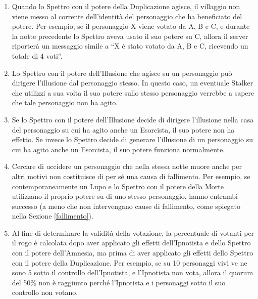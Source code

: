 \documentclass[a4paper,10pt]{article}
\begin{document}
\begin{enumerate}
 \item Quando lo Spettro con il potere della Duplicazione agisce, il villaggio
non viene messo al corrente dell'identità del personaggio che ha beneficiato del
potere. Per esempio, se il personaggio X viene votato da A, B e C, e durante la
notte precedente lo Spettro aveva usato il suo potere su C, allora il server
riporterà un messaggio simile a ``X è stato votato da A, B e C, ricevendo un
totale di 4 voti''.
 
 \item Lo Spettro con il potere dell'Illusione che agisce su un personaggio può
dirigere l'illusione dal personaggio stesso. In questo caso, un eventuale Stalker
che utilizzi a sua volta il suo potere sullo stesso personaggio verrebbe a
sapere che tale personaggio non ha agito.
 
 \item  Se lo Spettro con il potere dell'Illusione decide di dirigere l'illusione 
nella casa del personaggio su cui ha agito anche un Esorcista, il suo potere
non ha effetto.
 Se invece lo Spettro decide di generare l'illusione di un personaggio su cui ha
agito anche un Esorcista, il suo potere funziona normalmente.
 
 \item Cercare di uccidere un personaggio che nella stessa notte muore anche per
altri motivi non costituisce di per sé una causa di fallimento.
 Per esempio, se contemporaneamente un Lupo e lo Spettro con il potere della
Morte utilizzano il proprio potere su di uno stesso personaggio, hanno entrambi
successo (a meno che non intervengano cause di fallimento, come spiegato nella
Sezione \ref{fallimento}).
 
 \item Al fine di determinare la validità della votazione, la percentuale di
 votanti per il rogo è calcolata dopo aver applicato gli effetti dell'Ipnotista
 e dello Spettro con il potere dell'Amnesia, ma prima di aver applicato gli effetti
 dello Spettro con il potere della Duplicazione.
 Per esempio, se su 10 personaggi vivi ve ne sono 5 sotto il controllo dell'Ipnotista,
 e l'Ipnotista non vota, allora il quorum del 50\% non è raggiunto perché l'Ipnotista
 e i personaggi sotto il suo controllo non votano.

 
\end{enumerate}

\printindex
\end{document}
